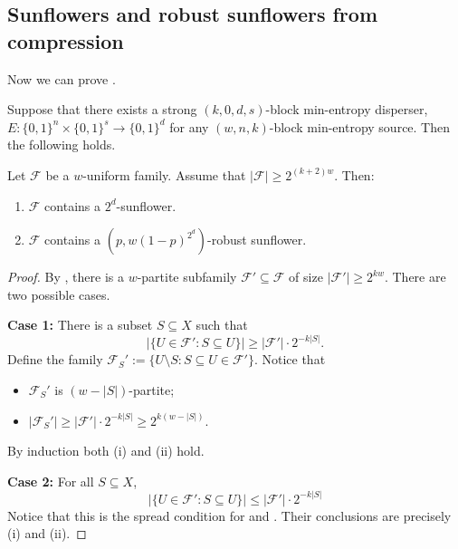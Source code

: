 \documentclass{toc}
\newcommand{\calF}{\mathcal{F}} %
\begin{document}
\subsection{Sunflowers and robust sunflowers from compression}

Now we can prove .

%
\begin{theorem}
Suppose that there exists a
strong $(k,0,d,s)$-block min-entropy disperser,
$E:\{0,1\}^{n}\times\{0,1\}^{s}\rightarrow\{0,1\}^{d}$ for any
$(w, n, k)$-block min-entropy source. Then the following holds.

Let $\calF$ be a %
$w$-uniform family.
Assume that $|\calF| \geq 2^{(k+2)  w}$. Then:
\begin{enumerate}
\item[(i)] $\calF$ contains a $2^d$-sunflower.
\item[(ii)] $\calF$ contains a
 $\left(p, w (1-p)^{2^{d}}\right)$-robust sunflower.
\end{enumerate}  %
\end{theorem}  %

\begin{proof}
By , there is a %
$w$-partite  %
%
subfamily   %
$\calF'\subseteq\calF$ of size $|\calF'|\geq2^{k w}$.
There are two possible cases.

\noindent  %
\textbf{Case 1:} There is a subset $S\subseteq X$ such that
$$
|\{U\in\calF': S\subseteq U\}|\geq |\calF'|\cdot 2^{-k |S|}.
$$
Define the family $\calF_{S}':=\{U\setminus S: S\subseteq U\in\calF'\}$. Notice that
\begin{itemize}
\item $\calF_{S}'$ is %
   $(w-|S|)$-partite;
\item $|\calF_{S}'|\geq  |\calF'|\cdot 2^{-k |S|}  \geq 2^{k (w-|S|)}.$
\end{itemize}
By induction both (i) and (ii) hold.

\noindent  %
\textbf{Case 2:} For all $S\subseteq X$,
$$
|\{U\in\calF': S\subseteq U\}|\leq |\calF'|\cdot 2^{-k |S|}
$$
Notice that this is the spread condition for  and
. Their conclusions are precisely (i) and (ii).
\end{proof}


%
%
%
%


%
%
%
%
%
\end{document}
